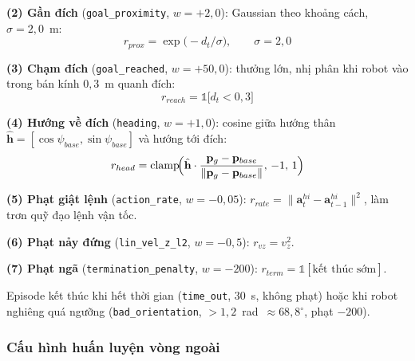 \textbf{(2) Gần đích} (\texttt{goal\_proximity}, $w=+2{,}0$): Gaussian theo
khoảng cách, $\sigma=2{,}0$~m:
\begin{equation}
    r_{prox} = \exp\!\bigl(-d_t/\sigma\bigr),\qquad \sigma=2{,}0
    \label{eq:nav_proximity}
\end{equation}

\textbf{(3) Chạm đích} (\texttt{goal\_reached}, $w=+50{,}0$): thưởng lớn,
nhị phân khi robot vào trong bán kính $0{,}3$~m quanh đích:
\begin{equation}
    r_{reach} = \mathbb{1}\!\bigl[d_t < 0{,}3\bigr]
    \label{eq:nav_reached}
\end{equation}

\textbf{(4) Hướng về đích} (\texttt{heading}, $w=+1{,}0$): cosine giữa hướng
thân $\hat{\mathbf{h}}=[\cos\psi_{base},\sin\psi_{base}]$ và hướng tới đích:
\begin{equation}
    r_{head} = \operatorname{clamp}\!\Bigl(
        \hat{\mathbf{h}}\cdot
        \frac{\mathbf{p}_g-\mathbf{p}_{base}}{\lVert\mathbf{p}_g-\mathbf{p}_{base}\rVert},
        \,-1,\,1\Bigr)
    \label{eq:nav_heading}
\end{equation}

\textbf{(5) Phạt giật lệnh} (\texttt{action\_rate}, $w=-0{,}05$):
$r_{rate}=\lVert\mathbf{a}^{hi}_t-\mathbf{a}^{hi}_{t-1}\rVert^2$, làm trơn
quỹ đạo lệnh vận tốc.

\textbf{(6) Phạt nảy đứng} (\texttt{lin\_vel\_z\_l2}, $w=-0{,}5$):
$r_{vz}=v_z^2$.

\textbf{(7) Phạt ngã} (\texttt{termination\_penalty}, $w=-200$):
$r_{term}=\mathbb{1}[\text{kết thúc sớm}]$.

Episode kết thúc khi hết thời gian (\texttt{time\_out}, $30$~s, không phạt)
hoặc khi robot nghiêng quá ngưỡng (\texttt{bad\_orientation},
$>1{,}2$~rad~$\approx 68{,}8^\circ$, phạt $-200$).

\subsubsection{Cấu hình huấn luyện vòng ngoài}

